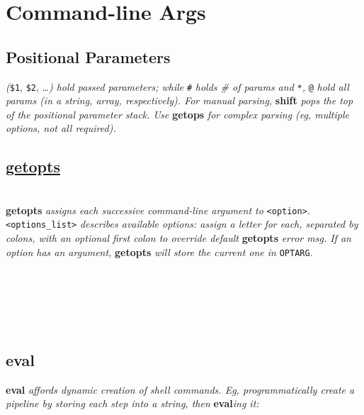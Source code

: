 \section{Command-line Args}



\subsection*{Positional Parameters}
\textit{ (}\texttt{\$1}, \texttt{\$2}, \dots\textit{) hold passed parameters; while }\texttt{\#}\textit{ holds \# of params and }\texttt{*}\textit{, }\texttt{@}\textit{ hold all params (in a string, array, respectively). For manual parsing, }\textbf{shift}\textit{ pops the top of the positional parameter stack. Use }\textbf{getops}\textit{ for complex parsing (eg, multiple options, not all required).}



\subsection*{\href{https://stackoverflow.com/questions/16483119/an-example-of-how-to-use-getopts-in-bash}{getopts}}
\\
\textbf{getopts}\textit{ assigns each successive command-line argument to }\texttt{<option>}\textit{. }\texttt{<options\_list>}\textit{ describes available options: assign a letter for each, separated by colons, with an optional first colon to override default }\textbf{getopts}\textit{ error msg. If an option has an argument, }\textbf{getopts}\textit{ will store the current one in }\texttt{OPTARG}. \\ %
\\
\\
\\
\\
\\


\subsection*{eval}
\textbf{eval}\textit{ affords dynamic creation of shell commands. Eg, programmatically create a pipeline by storing each step into a string, then }\textbf{eval}\textit{ing it:}\\

